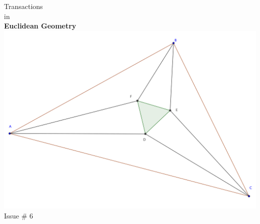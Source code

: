 \documentclass{report}
\begin{document}
\thispagestyle{empty}
\begin{center}
{\Huge Transactions\\ in\\ \textbf{Euclidean Geometry}}
\vspace{1in}
\includegraphics[width=1.1\textwidth]{cover-image.png}
\vfill
{\Huge Issue \# 6}
\end{center}














\end{document}
